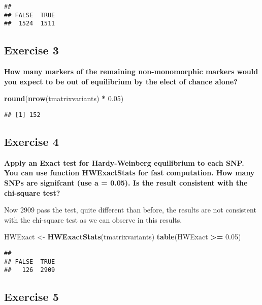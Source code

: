 \documentclass[]{article}
\newenvironment{Shaded}{\begin{snugshade}}{\end{snugshade}}
\newcommand{\KeywordTok}[1]{\textcolor[rgb]{0.13,0.29,0.53}{\textbf{#1}}}
\newcommand{\FloatTok}[1]{\textcolor[rgb]{0.00,0.00,0.81}{#1}}
\newcommand{\StringTok}[1]{\textcolor[rgb]{0.31,0.60,0.02}{#1}}
\newcommand{\OperatorTok}[1]{\textcolor[rgb]{0.81,0.36,0.00}{\textbf{#1}}}
\newcommand{\NormalTok}[1]{#1}
\begin{document}
\begin{verbatim}
## 
## FALSE  TRUE 
##  1524  1511
\end{verbatim}

\subsection{Exercise 3}\label{exercise-3}

\textbf{How many markers of the remaining non-monomorphic markers would
you expect to be out of equilibrium by the elect of chance alone?}

\begin{Shaded}
\begin{Highlighting}[]
\KeywordTok{round}\NormalTok{(}\KeywordTok{nrow}\NormalTok{(tmatrixvariants) }\OperatorTok{*}\StringTok{ }\FloatTok{0.05}\NormalTok{)}
\end{Highlighting}
\end{Shaded}

\begin{verbatim}
## [1] 152
\end{verbatim}

\subsection{Exercise 4}\label{exercise-4}

\textbf{Apply an Exact test for Hardy-Weinberg equilibrium to each SNP.
You can use function HWExactStats for fast computation. How many SNPs
are signifcant (use a = 0.05). Is the result consistent with the
chi-square test?}

Now 2909 pass the test, quite different than before, the results are not
consistent with the chi-square test as we can observe in this results.

\begin{Shaded}
\begin{Highlighting}[]
\NormalTok{HWExact <-}\StringTok{ }\KeywordTok{HWExactStats}\NormalTok{(tmatrixvariants)}
\KeywordTok{table}\NormalTok{(HWExact }\OperatorTok{>=}\StringTok{ }\FloatTok{0.05}\NormalTok{)}
\end{Highlighting}
\end{Shaded}

\begin{verbatim}
## 
## FALSE  TRUE 
##   126  2909
\end{verbatim}

\subsection{Exercise 5}\label{exercise-5}
\end{document}
